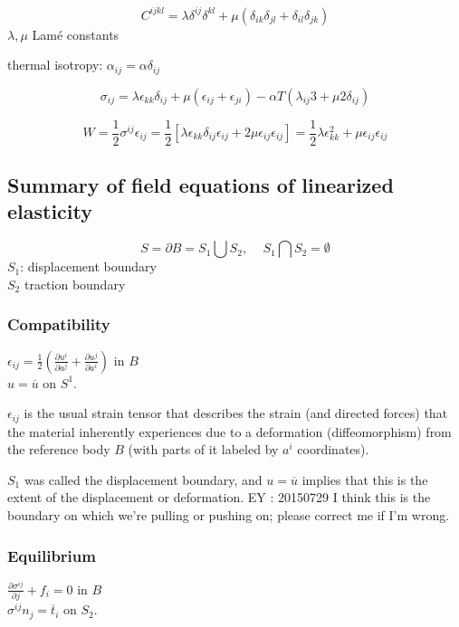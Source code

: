 \documentclass[twoside,landscape,10pt]{amsart}
\theoremstyle{plain}
\theoremstyle{definition}
\theoremstyle{remark}
\begin{document}
\begin{multicols*}{2}
\[
C^{ijkl} = \lambda \delta^{ij} \delta^{kl} + \mu (\delta_{ik} \delta_{jl} + \delta_{il} \delta_{jk})
\]
$\lambda,\mu$ Lam\'e constants

thermal isotropy: $\alpha_{ij} = \alpha \delta_{ij}$

\[
\sigma_{ij} = \lambda \epsilon_{kk} \delta_{ij} + \mu(\epsilon_{ij} + \epsilon_{ji}) - \alpha T(\lambda_{ij} 3 + \mu 2 \delta_{ij} )
\]

\[
W = \frac{1}{2} \sigma^{ij} \epsilon_{ij} = \frac{1}{2}[\lambda \epsilon_{kk} \delta_{ij} \epsilon_{ij} + 2 \mu \epsilon_{ij} \epsilon_{ij} ] = \frac{1}{2} \lambda \epsilon_{kk}^2 + \mu \epsilon_{ij}\epsilon_{ij}
\]

\subsection{Summary of field equations of linearized elasticity}

\[
S = \partial B = S_1 \bigcup S_2 , \quad \, S_1 \bigcap S_2 = \emptyset
\]
$S_1$: displacement boundary \\
$S_2$ traction boundary

\subsubsection{Compatibility}

$\epsilon_{ij} = \frac{1}{2} ( \frac{ \partial u^i}{ \partial a^j} + \frac{ \partial u^j}{ \partial a^i } )$ in $B$ \\
$u = \overline{u}$ on $S^1$.  

$\epsilon_{ij}$ is the usual strain tensor that describes the strain (and directed forces) that the material inherently experiences due to a deformation (diffeomorphism) from the reference body $B$ (with parts of it labeled by $a^i$ coordinates).  

$S_1$ was called the displacement boundary, and $u = \overline{u}$ implies that this is the extent of the displacement or deformation.  EY : 20150729 I think this is the boundary on which we're pulling or pushing on; please correct me if I'm wrong.  

\subsubsection{Equilibrium}

$\frac{ \partial \sigma^{ij}}{ \partial j} + f_i = 0$ in $B$ \\
$\sigma^{ij}n_j = \overline{t}_i$ on $S_2$.  


\end{multicols*}
\end{document}
